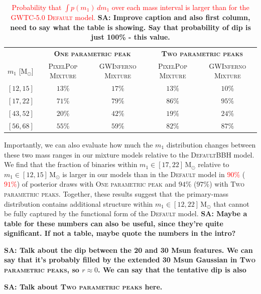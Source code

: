 \documentclass[twocolumn,twocolappendix,linenumbers]{aastex631}
\newcommand{\sa}[1]{{\bf\color{Thistle}SA: #1}}
\newcommand{\PPMixture}{\textsc{PixelPop Mixture}\xspace}
\newcommand{\GwinfMixture}{\textsc{GWInferno Mixture}\xspace}
\newcommand{\oneparpeak}{\textsc{One parametric peak}\xspace}
\newcommand{\twoparpeaks}{\textsc{Two parametric peaks}\xspace}
\newcommand{\Default}{\textsc{Default}\xspace}
\newcommand{\Msun}{\ensuremath{\mathrm{M}_\odot}\xspace}
\begin{document}
\begin{table}
    \centering
    \label{tab:integrated-fracs}
    \begin{tabular}{lcccc}
        \hline\hline
        & \multicolumn{2}{c}{\textbf{\oneparpeak}} & \multicolumn{2}{c}{\textbf{\twoparpeaks}} \\
        $m_1$ [\Msun] & \PPMixture & \GwinfMixture & \PPMixture & \GwinfMixture \\
        \hline
        $[12,15]$ & $13\%$ & $17\%$ & $13\%$ & $10\%$ \\
        $[17,22]$ & $71\%$ & $79\%$ & $86\%$ & $95\%$ \\
        $[43,52]$ & $20\%$ & $42\%$ & $19\%$ & $24\%$ \\
        $[56,68]$ & $55\%$ & $59\%$ & $82\%$ & $87\%$ \\
        \hline\hline
    \end{tabular}
        \caption{\textcolor{red}{Probability that $\int p(m_1)\,dm_1$ over each mass interval is larger than for
    the GWTC-5.0 \textsc{Default} model.} \sa{Improve caption and also first column, need to say what the table is showing. Say that probability of dip is just 100\% - this value.}}
\end{table}

Importantly, we can also evaluate how much the $m_1$ distribution changes between these two mass ranges in our mixture models relative to the \Default \ac{BBH} model.
We find that the fraction of binaries within $m_1 \in [17,22]\,\Msun$ relative to $m_1 \in [12,15]\,\Msun$ is larger in our models than in the \textsc{Default} model in \textcolor{red}{$90\%$} (\textcolor{red}{$91\%$}) of posterior draws with \oneparpeak and $94\%$ ($97\%$) with \twoparpeaks.
Together, these results suggest that the primary-mass distribution contains additional structure within $m_1 \in [12,22]\,\Msun$ that cannot be fully captured by the functional form of the \textsc{Default} model. \sa{Maybe a table for these numbers can also be useful, since they're quite significant. If not a table, maybe quote the numbers in the intro?}

\sa{Talk about the dip between the 20 and 30 Msun features. We can say that it's probably filled by the extended 30 Msun Gaussian in \twoparpeaks, so $r\approx0$. We can say that the tentative dip is also }

\sa{Talk about \twoparpeaks here.}

\end{document}
